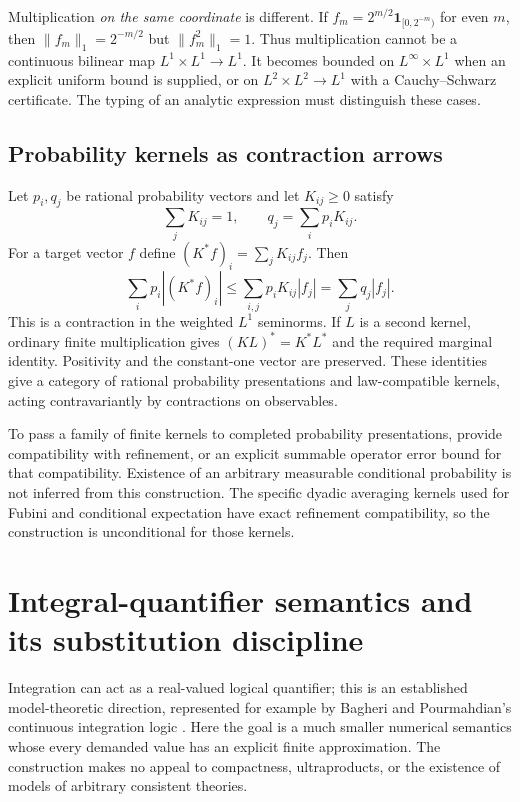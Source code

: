 Multiplication \emph{on the same coordinate} is different. If
$f_m=2^{m/2}\mathbf1_{[0,2^{-m})}$ for even $m$, then
$\|f_m\|_1=2^{-m/2}$ but $\|f_m^2\|_1=1$. Thus multiplication cannot be a
continuous bilinear map $L^1\times L^1\to L^1$. It becomes bounded on
$L^\infty\times L^1$ when an explicit uniform bound is supplied, or on
$L^2\times L^2\to L^1$ with a Cauchy--Schwarz certificate. The typing of an
analytic expression must distinguish these cases.

\subsection{Probability kernels as contraction arrows}

Let $p_i,q_j$ be rational probability vectors and let $K_{ij}\geq0$ satisfy
\[
       \sum_jK_{ij}=1,\qquad q_j=\sum_i p_iK_{ij}.
\]
For a target vector $f$ define $(K^*f)_i=\sum_jK_{ij}f_j$.
Then
\[
 \sum_i p_i|(K^*f)_i|
 \leq\sum_{i,j}p_iK_{ij}|f_j|
 =\sum_jq_j|f_j|.
\]
This is a contraction in the weighted $L^1$ seminorms. If $L$ is a second
kernel, ordinary finite multiplication gives
$(KL)^*=K^*L^*$ and the required marginal identity. Positivity and the
constant-one vector are preserved. These identities give a category of
rational probability presentations and law-compatible kernels, acting
contravariantly by contractions on observables.

To pass a family of finite kernels to completed probability presentations,
provide compatibility with refinement, or an explicit summable operator
error bound for that compatibility. Existence of an arbitrary measurable
conditional probability is not inferred from this construction. The
specific dyadic averaging kernels used for Fubini and conditional
expectation have exact refinement compatibility, so the construction is
unconditional for those kernels.

\section{Integral-quantifier semantics and its substitution discipline}
\label{ct:logic}

Integration can act as a real-valued logical quantifier; this is an
established model-theoretic direction, represented for example by Bagheri
and Pourmahdian's continuous integration logic
\cite{ct-integration-logic}. Here the goal is a much smaller numerical
semantics whose every demanded value has an explicit finite approximation.
The construction makes no appeal to compactness, ultraproducts, or the
existence of models of arbitrary consistent theories.


